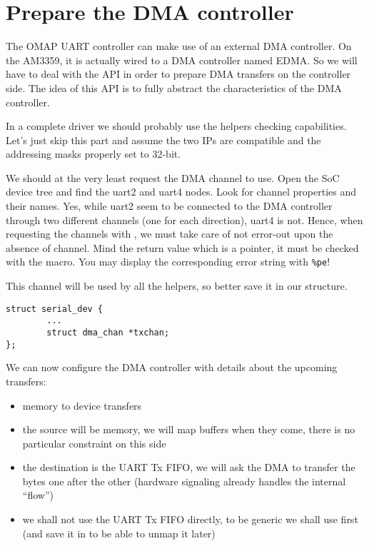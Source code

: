 \section{Prepare the DMA controller}

The OMAP UART controller can make use of an external DMA controller. On
the AM3359, it is actually wired to a DMA controller named EDMA. So we
will have to deal with the  API in order to prepare DMA
transfers on the controller side. The idea of this API is to fully
abstract the characteristics of the DMA controller.

In a complete driver we should probably use the helpers checking
capabilities. Let's just skip this part and assume the two IPs are
compatible and the addressing masks properly set to 32-bit.

We should at the very least request the DMA channel to use. Open the SoC
device tree and find the uart2 and uart4 nodes. Look for 
channel properties and their names. Yes, while uart2 seem to be
connected to the DMA controller through two different channels (one for
each direction), uart4 is not. Hence, when requesting the channels with
, we must take care of not error-out upon the
absence of channel. Mind the return value which is a 
pointer, it must be checked with the  macro. You may display the
corresponding error string with {\tt \%pe}!

This channel will be used by all the  helpers, so better
save it in our  structure.
\begin{verbatim}
struct serial_dev {
        ...
        struct dma_chan *txchan;
};
\end{verbatim}

We can now configure the DMA controller with details about the upcoming
transfers:
\begin{itemize}
\item memory to device transfers
\item the source will be memory, we will map buffers when they come,
  there is no particular constraint on this side
\item the destination is the UART Tx FIFO, we will ask the DMA to
  transfer the bytes one after the other (hardware signaling already
  handles the internal ``flow'')
\item we shall not use the UART Tx FIFO directly, to be generic we shall use
   first (and save it in  to be able
  to unmap it later)
\end{itemize}

